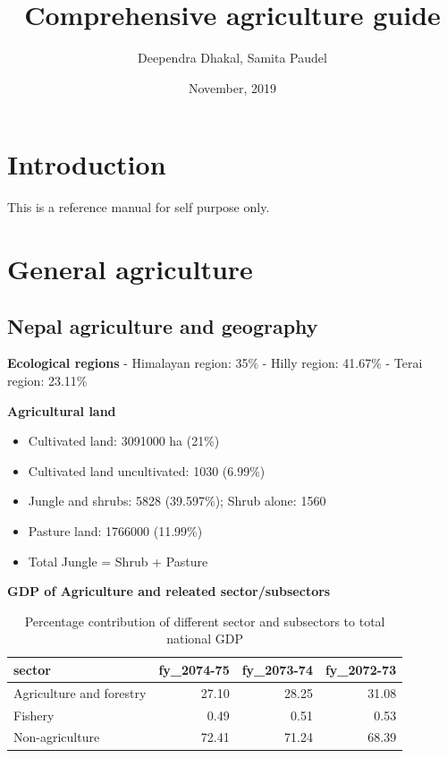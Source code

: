 \documentclass[
]{book}
\title{Comprehensive agriculture guide}
\author{Deependra Dhakal, Samita Paudel}
\date{November, 2019}
\providecommand{\tightlist}{%
  \setlength{\itemsep}{0pt}\setlength{\parskip}{0pt}}
\begin{document}
\maketitle

{
\setcounter{tocdepth}{1}
\tableofcontents
}
\hypertarget{introduction}{%
\chapter{Introduction}\label{introduction}}

This is a reference manual for self purpose only.

\hypertarget{general-agriculture}{%
\chapter{General agriculture}\label{general-agriculture}}

\hypertarget{nepal-agriculture-and-geography}{%
\section{Nepal agriculture and geography}\label{nepal-agriculture-and-geography}}

\textbf{Ecological regions}
- Himalayan region: 35\%
- Hilly region: 41.67\%
- Terai region: 23.11\%

\textbf{Agricultural land}

\begin{itemize}
\tightlist
\item
  Cultivated land: 3091000 ha (21\%)
\item
  Cultivated land uncultivated: 1030 (6.99\%)
\item
  Jungle and shrubs: 5828 (39.597\%); Shrub alone: 1560
\item
  Pasture land: 1766000 (11.99\%)
\item
  Total Jungle = Shrub + Pasture
\end{itemize}

\textbf{GDP of Agriculture and releated sector/subsectors}

\begin{table}

\caption{\label{tab:unnamed-chunk-2}Percentage contribution of different sector and subsectors to total national GDP}
\centering
\begin{tabular}[t]{lrrr}
\toprule
sector & fy\_2074-75 & fy\_2073-74 & fy\_2072-73\\
\midrule
Agriculture and forestry & 27.10 & 28.25 & 31.08\\
Fishery & 0.49 & 0.51 & 0.53\\
Non-agriculture & 72.41 & 71.24 & 68.39\\
\bottomrule
\end{tabular}
\end{table}
\end{document}
